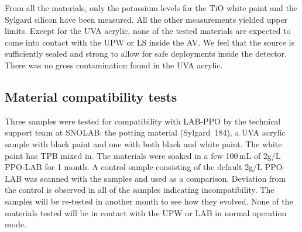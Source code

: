 From all the materials, only the potassium levels for the TiO white paint and the Sylgard silicon have been measured. All the other measurements yielded upper limits. Except for the UVA acrylic, none of the tested materials are expected to come into contact with the UPW or LS inside the AV. We feel that the source is sufficiently sealed and strong to allow for safe deployments inside the detector. There was no gross contamination found in the UVA acrylic.

\subsection{Material compatibility tests}
\label{sec:comptest}
Three samples were tested for compatibility with LAB-PPO by the technical support team at SNOLAB: the potting material (Sylgard~184), a UVA acrylic sample with black paint and one with both black and white paint. The white paint has TPB mixed in. The materials were soaked in a few 100\,mL of 2g/L PPO-LAB for 1 month. A control sample consisting of the default 2g/L PPO-LAB was scanned with the samples and used as a comparison. Deviation from the control is observed in all of the samples indicating incompatibility. The samples will be re-tested in another month to see how they evolved. None of the materials tested will be in contact with the UPW or LAB in normal operation mode.
